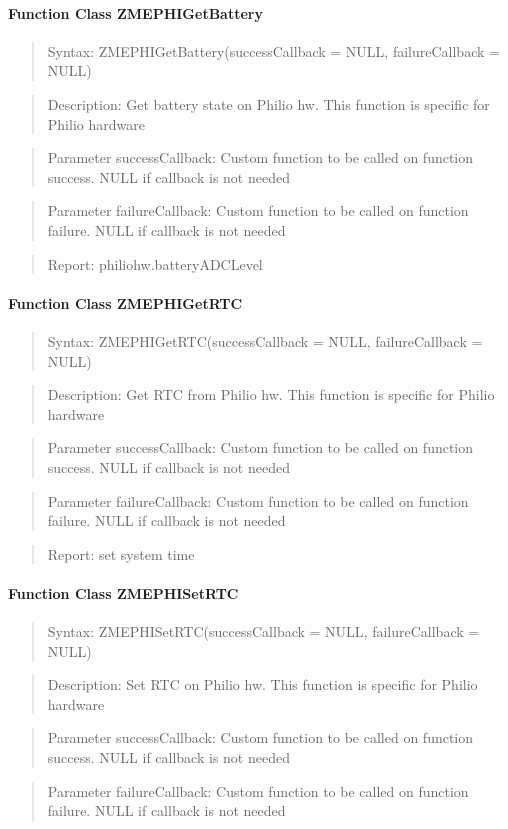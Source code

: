\paragraph{Function Class ZMEPHIGetBattery}
\begin{quote}Syntax: ZMEPHIGetBattery(successCallback = NULL, failureCallback = NULL)\end{quote}
\begin{quote}Description: Get battery state on Philio hw. This function is specific for Philio hardware\end{quote}
\begin{quote}Parameter successCallback: Custom function to be called on function success. NULL if callback is not needed\end{quote}
\begin{quote}Parameter failureCallback: Custom function to be called on function failure. NULL if callback is not needed\end{quote}
\begin{quote}Report: philiohw.batteryADCLevel\end{quote}

\paragraph{Function Class ZMEPHIGetRTC}
\begin{quote}Syntax: ZMEPHIGetRTC(successCallback = NULL, failureCallback = NULL)\end{quote}
\begin{quote}Description: Get RTC from Philio hw. This function is specific for Philio hardware\end{quote}
\begin{quote}Parameter successCallback: Custom function to be called on function success. NULL if callback is not needed\end{quote}
\begin{quote}Parameter failureCallback: Custom function to be called on function failure. NULL if callback is not needed\end{quote}
\begin{quote}Report: set system time\end{quote}

\paragraph{Function Class ZMEPHISetRTC}
\begin{quote}Syntax: ZMEPHISetRTC(successCallback = NULL, failureCallback = NULL)\end{quote}
\begin{quote}Description: Set RTC on Philio hw. This function is specific for Philio hardware\end{quote}
\begin{quote}Parameter successCallback: Custom function to be called on function success. NULL if callback is not needed\end{quote}
\begin{quote}Parameter failureCallback: Custom function to be called on function failure. NULL if callback is not needed\end{quote}


